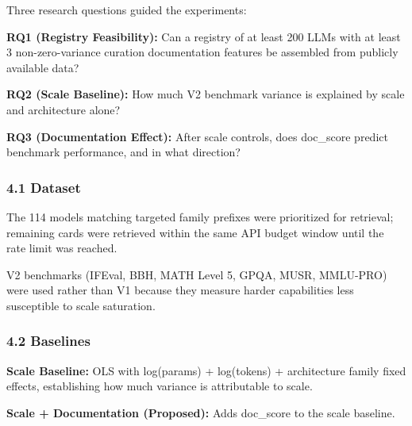 
Three research questions guided the experiments:

\textbf{RQ1 (Registry Feasibility):} Can a registry of at least 200 LLMs with at least 3 non-zero-variance curation documentation features be assembled from publicly available data?

\textbf{RQ2 (Scale Baseline):} How much V2 benchmark variance is explained by scale and architecture alone?

\textbf{RQ3 (Documentation Effect):} After scale controls, does doc\_score predict benchmark performance, and in what direction?

\subsubsection{4.1 Dataset}

\begin{table}[htbp]
\centering
{}
\end{table}

The 114 models matching targeted family prefixes were prioritized for retrieval; remaining cards were retrieved within the same API budget window until the rate limit was reached.

V2 benchmarks (IFEval, BBH, MATH Level 5, GPQA, MUSR, MMLU-PRO) were used rather than V1 because they measure harder capabilities less susceptible to scale saturation.

\subsubsection{4.2 Baselines}

\textbf{Scale Baseline:} OLS with log(params) + log(tokens) + architecture family fixed effects, establishing how much variance is attributable to scale.

\textbf{Scale + Documentation (Proposed):} Adds doc\_score to the scale baseline.

